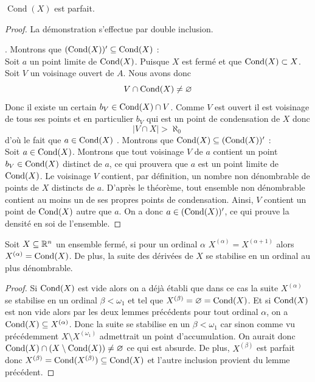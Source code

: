\begin{lemme}
    $\operatorname{Cond}(X)$ est parfait.
\end{lemme}

\begin{proof}
    La démonstration s'effectue par double inclusion.

    . Montrons que $(\operatorname{Cond}(X))' \subseteq \operatorname{Cond}(X)$ : \\
    Soit $a$ un point limite de $\operatorname{Cond}(X)$. Puisque $X$ est fermé et que $\operatorname{Cond}(X) \subset X$. Soit $V$ un voisinage ouvert de $A$. Nous avons donc
    \[
    V\cap \operatorname{Cond}(X) \neq \varnothing
    \]
    Donc il existe un certain $b_V \in \operatorname{Cond}(X)\cap V$. Comme $V$ est ouvert il est voisinage de tous ses points et en particulier $b_V$ qui est un point de condensation de $X$ donc 
    \[|V\cap X|>\aleph_0\]
    d'où le fait que $a\in \operatorname{Cond}(X)$
    \vspace{0.3cm}
    . Montrons que $\operatorname{Cond}(X) \subseteq (\operatorname{Cond}(X))'$ : \\
    Soit $a \in \operatorname{Cond}(X)$. Montrons que tout voisinage $V$ de $a$ contient un point $b_V \in \operatorname{Cond}(X)$ distinct de $a$, ce qui prouvera que $a$ est un point limite de $\operatorname{Cond}(X)$. 
    Le voisinage $V$ contient, par définition, un nombre non dénombrable de points de $X$ distincts de $a$. 
    D'après le théorème, tout ensemble non dénombrable contient au moins un de ses propres points de condensation. Ainsi, $V$ contient un point de $\operatorname{Cond}(X)$ autre que $a$. 
    On a donc $a \in (\operatorname{Cond}(X))'$, ce qui prouve la densité en soi de l'ensemble.
\end{proof}

\begin{theoreme}
    Soit $X\subseteq \mathbb{R}^n$ un ensemble fermé, si pour un ordinal $\alpha$ $X^{(\alpha)}=X^{(\alpha+1)}$ alors $X^{(\alpha)}= \operatorname{Cond}(X)$. De plus, la suite des dérivées de $X$ se stabilise en un ordinal au plus dénombrable.
\end{theoreme}

\begin{proof}
    Si $\operatorname{Cond} (X)$ est vide alors on a déjà établi que dans ce cas la suite $X^{(\alpha)}$ se stabilise en un ordinal $\beta<\omega_1$ et tel que $X^{(\beta)}=\varnothing=\operatorname{Cond} (X)$. Et si $\operatorname{Cond} (X)$ est non vide alors par les deux lemmes précédents pour tout  ordinal $\alpha$, on a $\operatorname{Cond}(X)\subseteq X^{(\alpha)}$. Donc la suite se stabilise en un $\beta< \omega_1$ car sinon comme vu précédemment $X\setminus X^{(\omega_1)}$ admettrait un point d'accumulation. On aurait donc $\operatorname{Cond}(X)\cap(X\setminus \operatorname{Cond}(X))\neq \varnothing$ ce qui est absurde. De plus, $X^{(\beta)}$ est parfait donc $X^{(\beta)}=\operatorname{Cond}(X^{(\beta)})\subseteq \operatorname{Cond}(X)$ et l'autre inclusion provient du lemme précédent.
\end{proof}

